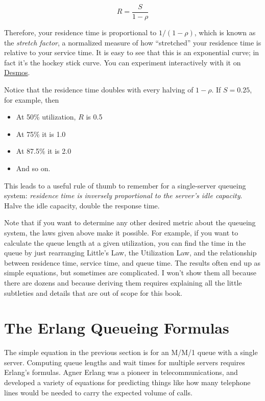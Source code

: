 \documentclass{vivid_layout_pdf}
\begin{document}
\[
  R = \frac{S}{1 - \rho}
\]

Therefore, your residence time is proportional to \( 1/(1-\rho) \), which is known as the {\itshape stretch factor}, a normalized measure of how ``stretched'' your residence time is relative to your service time. It is easy to see that this is an exponential curve; in fact it's the hockey stick curve. You can experiment interactively with it on \href{https://www.desmos.com/calculator/vhvwh6vjo7}{Desmos}.

Notice that the residence time doubles with every halving of \( 1-\rho \). If \( S = 0.25 \), for example, then

\begin{itemize}
\item At 50\% utilization, \( R \) is 0.5
\item At 75\% it is 1.0
\item At 87.5\% it is 2.0
\item And so on.
\end{itemize}

This leads to a useful rule of thumb to remember for a single-server queueing system: {\itshape residence time is inversely proportional to the server's idle capacity}. Halve the idle capacity, double the response time.

Note that if you want to determine any other desired metric about the queueing system, the laws given above make it possible. For example, if you want to calculate the queue length at a given utilization, you can find the time in the queue by just rearranging Little's Law, the Utilization Law, and the relationship between residence time, service time, and queue time. The results often end up as simple equations, but sometimes are complicated. I won't show them all because there are dozens and because deriving them requires explaining all the little subtleties and details that are out of scope for this book.

\section{The Erlang Queueing Formulas}

The simple equation in the previous section is for an M/M/1 queue with a single server. Computing queue lengths and wait times for multiple servers requires Erlang's formulas. Agner Erlang was a pioneer in telecommunications, and developed a variety of equations for predicting things like how many telephone lines would be needed to carry the expected volume of calls.
\end{document}
